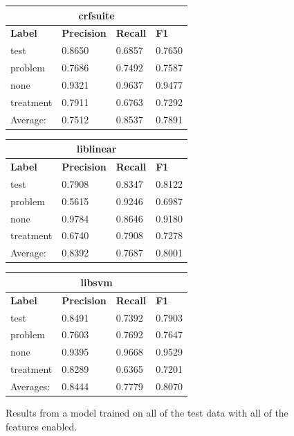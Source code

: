 \documentclass[preprint]{style}
\begin{document}
\begin{figure}[t]
\begin{center}
	\begin{tabular}{|l|l|l|l|}
	\hline
	\multicolumn{4}{|c|}{\bf crfsuite} \\ \hline
	{\bf Label} & {\bf Precision} & {\bf Recall} & {\bf F1} \\ \hline
	
test & 0.8650 &	0.6857 &	0.7650 \\ \hline
problem & 0.7686 &	0.7492	& 0.7587 \\ \hline
none & 0.9321 & 	0.9637 &	0.9477 \\ \hline
treatment  & 0.7911 &	0.6763 &	0.7292 \\ \hline
	
	\hline
	Average: & 0.7512 &	 0.8537 &	0.7891 \\
	\hline
	\end{tabular}
\end{center}

\begin{center}
	\begin{tabular}{|l|l|l|l|}
	\hline
	\multicolumn{4}{|c|}{\bf liblinear} \\ \hline
	{\bf Label} & {\bf Precision} & {\bf Recall} & {\bf F1} \\ \hline

test  & 0.7908 & 0.8347 & 	0.8122 \\ \hline
problem  & 0.5615 & 	0.9246 &	0.6987 \\ \hline
none  & 0.9784	& 0.8646 &	0.9180 \\ \hline
treatment  & 0.6740 &	0.7908	& 0.7278 \\ \hline

	\hline
	Average: & 0.8392 &	 0.7687  &	0.8001 \\
	\hline
	\end{tabular}
\end{center}
		
\begin{center}	
	\begin{tabular}{|l|l|l|l|}
	\hline
	\multicolumn{4}{|c|}{\bf libsvm} \\ \hline
	{\bf Label} & {\bf Precision} & {\bf Recall} & {\bf F1} \\ \hline

     test & 0.8491 &	0.7392	& 0.7903 \\ \hline
  problem & 0.7603 &	0.7692 &	0.7647 \\ \hline
     none & 0.9395	 & 0.9668	& 0.9529 \\ \hline
treatment & 0.8289 &	0.6365 &	0.7201\\ \hline

	\hline
	Averages: & 0.8444 &	 0.7779  & 	0.8070 \\
	\hline
	\end{tabular}
\end{center}

\caption{Results from a model trained on all of the test data with all of the features enabled.}
\label{fig:all_features_results}
\end{figure}
\end{document}
